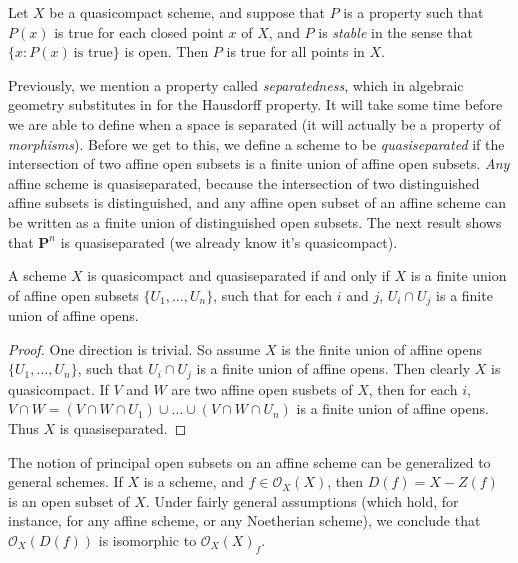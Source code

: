 \begin{corollary}
    Let $X$ be a quasicompact scheme, and suppose that $P$ is a property such that $P(x)$ is true for each closed point $x$ of $X$, and $P$ is \emph{stable} in the sense that $\{ x : P(x)\ \text{is true} \}$ is open. Then $P$ is true for all points in $X$.
\end{corollary}

Previously, we mention a property called \emph{separatedness}, which in algebraic geometry substitutes in for the Hausdorff property. It will take some time before we are able to define when a space is separated (it will actually be a property of \emph{morphisms}). Before we get to this, we define a scheme to be \emph{quasiseparated} if the intersection of two affine open subsets is a finite union of affine open subsets. \emph{Any} affine scheme is quasiseparated, because the intersection of two distinguished affine subsets is distinguished, and any affine open subset of an affine scheme can be written as a finite union of distinguished open subsets. The next result shows that $\mathbf{P}^n$ is quasiseparated (we already know it's quasicompact).

\begin{theorem}
    A scheme $X$ is quasicompact and quasiseparated if and only if $X$ is a finite union of affine open subsets $\{ U_1,\dots,U_n \}$, such that for each $i$ and $j$, $U_i \cap U_j$ is a finite union of affine opens.
\end{theorem}
\begin{proof}
    One direction is trivial. So assume $X$ is the finite union of affine opens $\{ U_1,\dots,U_n \}$, such that $U_i \cap U_j$ is a finite union of affine opens. Then clearly $X$ is quasicompact. If $V$ and $W$ are two affine open susbets of $X$, then for each $i$, $V \cap W = (V \cap W \cap U_1) \cup \dots \cup (V \cap W \cap U_n)$ is a finite union of affine opens. Thus $X$ is quasiseparated.
\end{proof}

The notion of principal open subsets on an affine scheme can be generalized to general schemes. If $X$ is a scheme, and $f \in \mathcal{O}_X(X)$, then $D(f) = X - Z(f)$ is an open subset of $X$. Under fairly general assumptions (which hold, for instance, for any affine scheme, or any Noetherian scheme), we conclude that $\mathcal{O}_X(D(f))$ is isomorphic to $\mathcal{O}_X(X)_f$.

